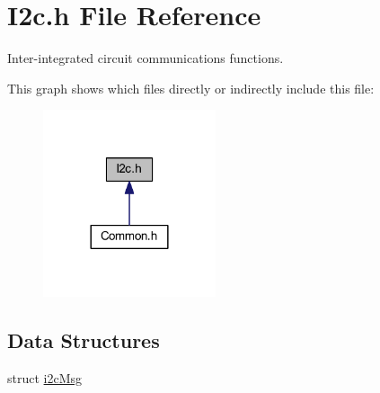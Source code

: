 \hypertarget{a00025}{\section{I2c.\-h File Reference}
\label{a00025}
}


Inter-\/integrated circuit communications functions.  


This graph shows which files directly or indirectly include this file\-:\nopagebreak
\begin{figure}[H]
\begin{center}
\leavevmode
\includegraphics[width=144pt]{a00065}
\end{center}
\end{figure}
\subsection*{Data Structures}
\begin{DoxyCompactItemize}
\item 
struct \hyperlink{a00006}{i2c\-Msg}
\end{DoxyCompactItemize}
